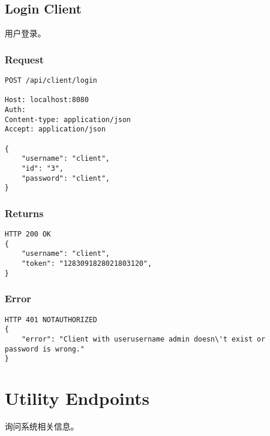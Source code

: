 \documentclass{article}
\begin{document}
\subsection{Login Client}
用户登录。

\subsubsection*{Request}
\begin{lstlisting}
POST /api/client/login

Host: localhost:8080
Auth:
Content-type: application/json
Accept: application/json

{
    "username": "client",
    "id": "3",
    "password": "client",
}
\end{lstlisting}

\subsubsection*{Returns}
\begin{lstlisting}
HTTP 200 OK
{
    "username": "client",
    "token": "1283091828021803120",
}

\end{lstlisting}

\subsubsection*{Error}
\begin{lstlisting}
HTTP 401 NOTAUTHORIZED
{
    "error": "Client with userusername admin doesn\'t exist or password is wrong."
}
\end{lstlisting}

\section{Utility Endpoints}
询问系统相关信息。
\end{document}

